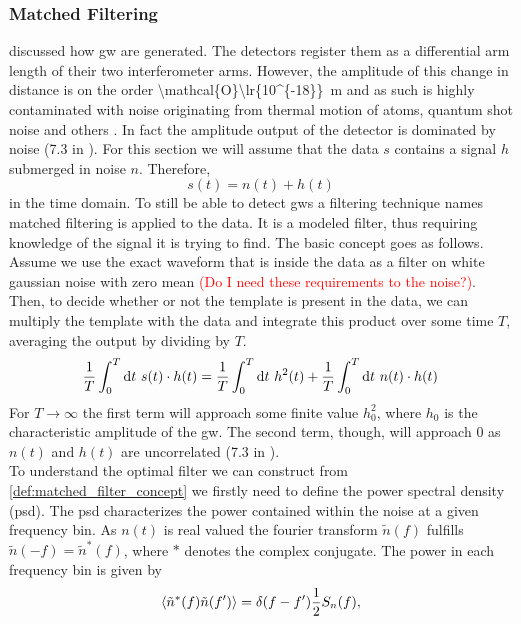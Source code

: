 \subsubsection{Matched Filtering}
 discussed how \gls{gw} are generated. The detectors register them as a differential arm length of their two interferometer arms. However, the amplitude of this change in distance is on the order \SI[parse-numbers=false]{\mathcal{O}\lr{10^{-18}}}{\meter} and as such is highly contaminated with noise originating from thermal motion of atoms, quantum shot noise and others \cite{frank_phd}. In fact the amplitude output of the detector is dominated by noise (7.3 in \cite{gwv1}). For this section we will assume that the data $s$ contains a signal $h$ submerged in noise $n$. Therefore,
\begin{equation}
s(t) = n(t) + h(t)
\end{equation}
in the time domain. To still be able to detect \gls{gw}s a filtering technique names matched filtering is applied to the data. It is a modeled filter, thus requiring knowledge of the signal it is trying to find. The basic concept goes as follows. Assume we use the exact waveform that is inside the data as a filter on white gaussian noise with zero mean \textcolor{red}{(Do I need these requirements to the noise?)}. Then, to decide whether or not the template is present in the data, we can multiply the template with the data and integrate this product over some time $T$, averaging the output by dividing by $T$.
\begin{equation}\label{def:matched_filter_concept}
\frac{1}{T}\int_0^T\diff t\ s(t)\cdot h(t) = \frac{1}{T}\int_0^T\diff t\ h^2(t) + \frac{1}{T}\int_0^T\diff t\ n(t)\cdot h(t)
\end{equation}
For $T\to\infty$ the first term will approach some finite value $h_0^2$, where $h_0$ is the characteristic amplitude of the \gls{gw}. The second term, though, will approach $0$ as $n(t)$ and $h(t)$ are uncorrelated (7.3 in \cite{gwv1}).\smallskip\\
To understand the optimal filter we can construct from \eqref{def:matched_filter_concept} we firstly need to define the power spectral density (\gls{psd}). The \gls{psd} characterizes the power contained within the noise at a given frequency bin. As $n(t)$ is real valued the fourier transform $\tilde{n}(f)$ fulfills $\tilde{n}(-f)=\tilde{n}^\ast(f)$, where $\ast$ denotes the complex conjugate. The power in each frequency bin is given by
\begin{equation}\label{def:psd}
\langle \tilde{n}^\ast(f)\tilde{n}(f')\rangle = \delta{\left( f-f' \right)}\frac{1}{2}S_n(f),
\end{equation}
